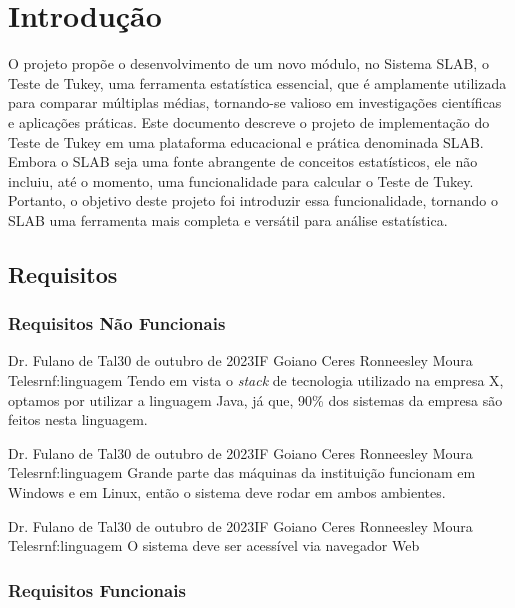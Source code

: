 \chapter{Introdução}
\label{capitulo:introducao}

O projeto propõe o desenvolvimento de um novo módulo, no Sistema SLAB, o Teste de Tukey, uma ferramenta estatística essencial, que é amplamente utilizada para comparar múltiplas médias, tornando-se valioso em investigações científicas e aplicações práticas. Este documento descreve o projeto de implementação do Teste de Tukey em uma plataforma educacional e prática denominada SLAB. Embora o SLAB seja uma fonte abrangente de conceitos estatísticos, ele não incluiu, até o momento, uma funcionalidade para calcular o Teste de Tukey. Portanto, o objetivo deste projeto foi introduzir essa funcionalidade, tornando o SLAB uma ferramenta mais completa e versátil para análise estatística.

\section{Requisitos}


\subsection{Requisitos Não Funcionais}

{Dr. Fulano de Tal}{30 de outubro de 2023}{IF Goiano Ceres}
{Ronneesley Moura Teles}{rnf:linguagem}
{
Tendo em vista o \textit{stack} de tecnologia utilizado na empresa X,
optamos por utilizar a linguagem Java, já que, 90\% dos
sistemas da empresa são feitos nesta linguagem.
}

{Dr. Fulano de Tal}{30 de outubro de 2023}{IF Goiano Ceres}
{Ronneesley Moura Teles}{rnf:linguagem}
{
Grande parte das máquinas da instituição funcionam em Windows e em
Linux, então o sistema deve rodar em ambos ambientes.
}

{Dr. Fulano de Tal}{30 de outubro de 2023}{IF Goiano Ceres}
{Ronneesley Moura Teles}{rnf:linguagem}
{
O sistema deve ser acessível via navegador Web
}

\subsection{Requisitos Funcionais}

